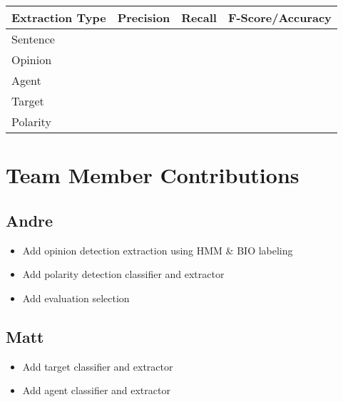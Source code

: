 \documentclass{article}
\begin{document}
    \begin{center} %
        \begin{tabular}{ | l | c | r | c}
            \hline
            Extraction Type & Precision & Recall & F-Score/Accuracy \\ \hline
            Sentence &  &  & \\ \hline
            Opinion &  &  & \\ \hline
            Agent &  &  & \\ \hline
            Target &  &  & \\ \hline
            Polarity &  &  & \\ \hline
        \end{tabular}
    \end{center}

    \section{Team Member Contributions}

        \subsection{Andre}

            \begin{itemize}
                \item Add opinion detection extraction using HMM \& BIO labeling
                \item Add polarity detection classifier and extractor
                \item Add evaluation selection
            \end{itemize}

        \subsection{Matt}

            \begin{itemize}
                \item Add target classifier and extractor
                \item Add agent classifier and extractor
            \end{itemize}
\end{document}
